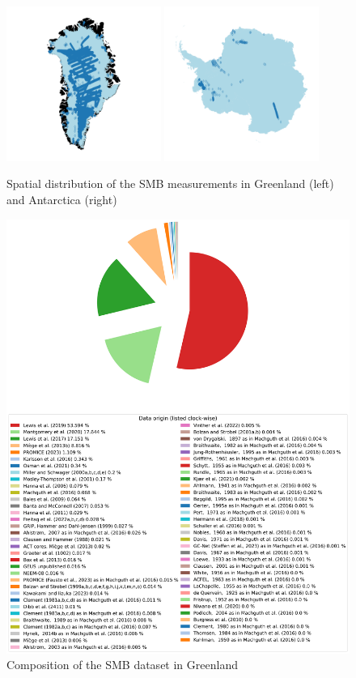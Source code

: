 \documentclass[journal abbreviation, manuscript]{copernicus}
\begin{document}
\begin{figure}[!htb]
\caption{Spatial distribution of the SMB measurements in Greenland (left) and Antarctica (right)}
\centering
\includegraphics[width=0.45\textwidth]{figures/SMB_map_greenland.png}
\includegraphics[width=0.45\textwidth]{figures/SMB_map_antarctica.png}
\end{figure}

\begin{figure}[!htb]
\caption{Composition of the SMB dataset in Greenland}
\centering
\includegraphics[scale=0.4]{figures/SMB_dataset_composition_greenland.png}
\end{figure}
\end{document}
